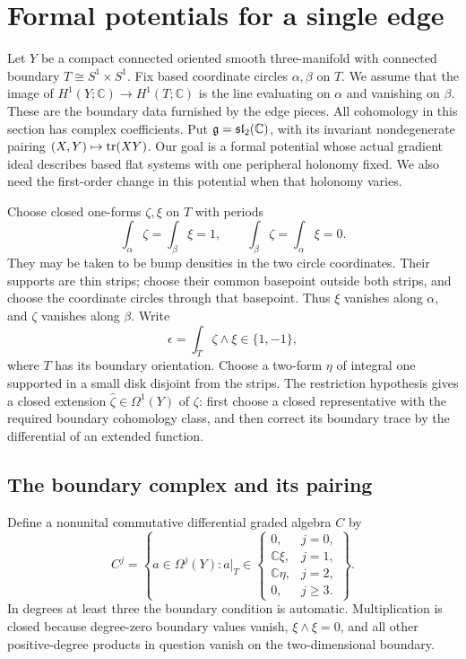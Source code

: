 \section{Formal potentials for a single edge}
\label{sec:edge-germs}

Let $Y$ be a compact connected oriented smooth three-manifold with
connected boundary $T\cong S^1\times S^1$.  Fix based coordinate circles
$\alpha,\beta$ on $T$.  We assume that the image of
$H^1(Y;\mathbb C)\to H^1(T;\mathbb C)$ is the line evaluating on
$\alpha$ and vanishing on $\beta$.  These are the boundary data furnished
by the edge pieces.  All cohomology in this section has complex
coefficients.  Put $\mathfrak{g}=\mathfrak{sl}_2(\mathbb C)$, with its invariant
nondegenerate pairing $(X,Y)\mapsto\operatorname{tr}(XY)$.
Our goal is a formal potential whose actual gradient ideal describes
based flat systems with one peripheral holonomy fixed. We also need
the first-order change in this potential when that holonomy varies.

Choose closed one-forms $\zeta,\xi$ on $T$ with periods
\[
 \int_\alpha\zeta=\int_\beta\xi=1,
 \qquad
 \int_\beta\zeta=\int_\alpha\xi=0.
\]
They may be taken to be bump densities in the two circle coordinates.
Their supports are thin strips; choose their common basepoint outside
both strips, and choose the coordinate circles through that basepoint.
Thus $\xi$ vanishes along $\alpha$, and $\zeta$ vanishes along $\beta$.
Write
\[
 \epsilon=\int_T\zeta\wedge\xi\in\{1,-1\},
\]
where $T$ has its boundary orientation.  Choose a two-form $\eta$ of
integral one supported in a small disk disjoint from the strips.  The
restriction hypothesis gives a closed extension
$\widehat\zeta\in\Omega^1(Y)$ of $\zeta$: first choose a closed
representative with the required boundary cohomology class, and then
correct its boundary trace by the differential of an extended function.

\subsection{The boundary complex and its pairing}

Define a nonunital commutative differential graded algebra $C$ by
\begin{equation}
\label{eq:edge-boundary-complex}
 C^j=\left\{a\in\Omega^j(Y):
 a|_T\in
 \begin{cases}
  0,&j=0,\\
  \mathbb C\xi,&j=1,\\
  \mathbb C\eta,&j=2,\\
  0,&j\geq3.
 \end{cases}\right\}.
\end{equation}
In degrees at least three the boundary condition is automatic.
Multiplication is closed because degree-zero boundary values vanish,
$\xi\wedge\xi=0$, and all other positive-degree products in question
vanish on the two-dimensional boundary.


